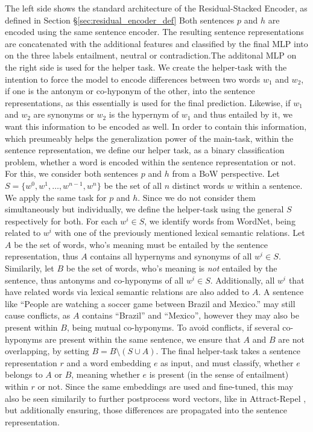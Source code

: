 The left side shows the standard architecture of the Residual-Stacked Encoder, as defined in Section §\ref{sec:residual_encoder_def} Both sentences $p$ and $h$ are encoded using the same sentence encoder. The resulting sentence representations are concatenated with the additional features and classified by the final \ac{MLP} into on the three labels entailment, neutral or contradiction.The additonal \ac{MLP} on the right side is used for the helper task. We create the helper-task with the intention to force the model to encode differences between two words $w_1$ and $w_2$, if one is the antonym or co-hyponym of the other, into the sentence representations, as this essentially is used for the final prediction.  Likewise, if $w_1$ and $w_2$ are synonyms or $w_2$ is the hypernym of $w_1$ and thus entailed by it, we want this information to be encoded as well. In order to contain this information, which preumeably helps the generalization power of the main-task, within the sentence representation, we define our helper task, as a binary classification problem, whether a word is encoded within the sentence representation or not. For this, we consider both sentences $p$ and $h$ from a \ac{BoW} perspective. Let $S=\{w^0, w^1 , \ldots, w^{n-1}, w^n\}$ be the set of all $n$ distinct words $w$ within a sentence. We apply the same task for $p$ and $h$. Since we do not consider them simultaneously but individually, we define the helper-task using the general $S$ respectively for both. For each $w^i \in S$, we identify words from WordNet, being related to $w^i$ with one of the previously mentioned lexical semantic relations. Let $A$ be the set of words, who's meaning must be entailed by the sentence representation, thus $A$ contains all hypernyms and synonyms of all $w^i \in S$. Similarily, let $B$ be the set of words, who's meaning is \textit{not} entailed by the sentence, thus antonyms and co-hyponyms of all $w^i \in S$. Additionally, all $w^i$ that have related words via lexical semantic relations are also added to $A$. A sentence like ``People are watching a soccer game between Brazil and Mexico.'' may still cause conflicts, as $A$ contains ``Brazil'' and ``Mexico'', however they may also be present within $B$, being mutual co-hyponyms. To avoid conflicts, if several co-hyponyms are present within the same sentence, we ensure that $A$ and $B$ are not overlapping, by setting $B = B \setminus (S \cup A)$. The final helper-task takes a sentence representation $r$ and a word embedding $e$ as input, and must classify, whether $e$ belongs to $A$ or $B$, meaning whether $e$ is present (in the sense of entailment) within $r$ or not. Since the same embeddings are used and fine-tuned, this may also be seen similarily to further postprocess word vectors, like in Attract-Repel \citep{vulic2017specialising}, but additionally ensuring, those differences are propagated into the sentence representation. 

